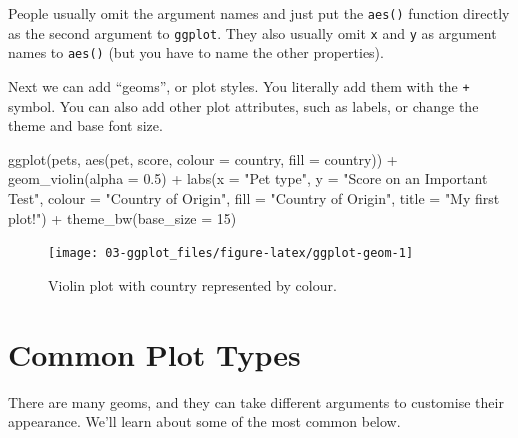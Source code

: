 \documentclass[
  oneside]{book}
\newenvironment{Shaded}{\begin{snugshade}}{\end{snugshade}}
\newcommand{\AttributeTok}[1]{\textcolor[rgb]{0.77,0.63,0.00}{#1}}
\newcommand{\DecValTok}[1]{\textcolor[rgb]{0.00,0.00,0.81}{#1}}
\newcommand{\FloatTok}[1]{\textcolor[rgb]{0.00,0.00,0.81}{#1}}
\newcommand{\FunctionTok}[1]{\textcolor[rgb]{0.00,0.00,0.00}{#1}}
\newcommand{\NormalTok}[1]{#1}
\newcommand{\SpecialCharTok}[1]{\textcolor[rgb]{0.00,0.00,0.00}{#1}}
\newcommand{\StringTok}[1]{\textcolor[rgb]{0.31,0.60,0.02}{#1}}
\begin{document}
\begin{info}
People usually omit the argument names and just put the \texttt{aes()} function directly as the second argument to \texttt{ggplot}. They also usually omit \texttt{x} and \texttt{y} as argument names to \texttt{aes()} (but you have to name the other properties).

\end{info}

Next we can add ``geoms'', or plot styles. You literally add them with the \texttt{+} symbol. You can also add other plot attributes, such as labels, or change the theme and base font size.

\begin{Shaded}
\begin{Highlighting}[]
\FunctionTok{ggplot}\NormalTok{(pets, }\FunctionTok{aes}\NormalTok{(pet, score, }\AttributeTok{colour =}\NormalTok{ country, }\AttributeTok{fill =}\NormalTok{ country)) }\SpecialCharTok{+}
  \FunctionTok{geom\_violin}\NormalTok{(}\AttributeTok{alpha =} \FloatTok{0.5}\NormalTok{) }\SpecialCharTok{+}
  \FunctionTok{labs}\NormalTok{(}\AttributeTok{x =} \StringTok{"Pet type"}\NormalTok{,}
       \AttributeTok{y =} \StringTok{"Score on an Important Test"}\NormalTok{,}
       \AttributeTok{colour =} \StringTok{"Country of Origin"}\NormalTok{,}
       \AttributeTok{fill =} \StringTok{"Country of Origin"}\NormalTok{,}
       \AttributeTok{title =} \StringTok{"My first plot!"}\NormalTok{) }\SpecialCharTok{+}
  \FunctionTok{theme\_bw}\NormalTok{(}\AttributeTok{base\_size =} \DecValTok{15}\NormalTok{)}
\end{Highlighting}
\end{Shaded}

\begin{figure}

{\centering \texttt{[image: 03-ggplot\_files/figure-latex/ggplot-geom-1]} 

}

\caption{Violin plot with country represented by colour.}\label{fig:ggplot-geom}
\end{figure}

\hypertarget{common-plot-types}{%
\section{Common Plot Types}\label{common-plot-types}}

There are many geoms, and they can take different arguments to customise their appearance. We'll learn about some of the most common below.
\end{document}
